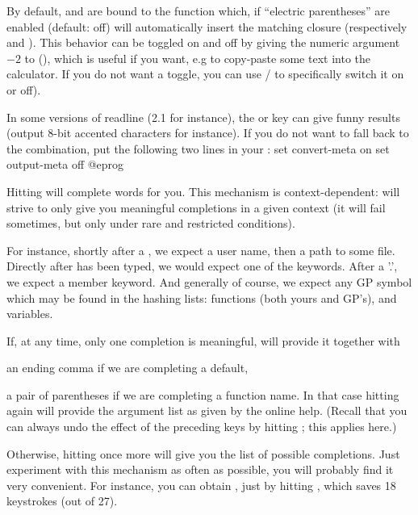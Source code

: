  By default, \kbd{(} and \kbd{[} are bound to the function
 which, if ``electric parentheses'' are enabled
(default: off) will automatically insert the matching closure (respectively
\kbd{)} and \kbd{]}). This behavior can be toggled on and off by giving
the numeric argument $-2$ to \kbd{(} (), which is useful if you
want, e.g to copy-paste some text into the calculator. If you do not want a
toggle, you can use  /  to specifically switch it on or
off).

 In some versions of readline (2.1 for instance), the
 or  key can give funny results (output 8-bit accented
characters for instance). If you do not want to fall back to the 
combination, put the following two lines in your :
%
\bprog
  set convert-meta on
  set output-meta off
@eprog

 Hitting
 will complete words for you. This mechanism is context-dependent:
 will strive to only give you meaningful completions in a given
context (it will fail sometimes, but only under rare and restricted
conditions).

  For instance, shortly after a \kbd{\til}, we expect a user name, then a
path to some file. Directly after  has been typed, we would
expect one of the  keywords. After a '.', we expect a member
keyword. And generally of course, we expect any GP symbol which may be found
in the hashing lists: functions (both yours and GP's), and variables.

  If, at any time, only one completion is meaningful,  will provide it
together with

\item an ending comma if we are completing a default,

\item a pair of parentheses if we are completing a function name. In
that case hitting  again will provide the argument list as given
by the online help. (Recall that you can always undo the effect
of the preceding keys by hitting ; this applies here.)

Otherwise, hitting  once more will give you the list of possible
completions. Just experiment with this mechanism as often as possible,
you will probably find it very convenient. For instance, you can obtain
, just by hitting ,
which saves 18 keystrokes (out of 27).


